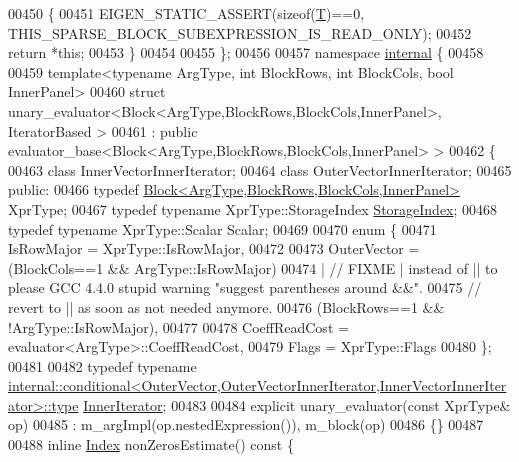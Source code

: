 \begin{DoxyCode}
00450     \{
00451       EIGEN\_STATIC\_ASSERT(\textcolor{keyword}{sizeof}(\hyperlink{group___sparse_core___module}{T})==0, THIS\_SPARSE\_BLOCK\_SUBEXPRESSION\_IS\_READ\_ONLY);
00452       \textcolor{keywordflow}{return} *\textcolor{keyword}{this};
00453     \}
00454 
00455 \};
00456 
00457 \textcolor{keyword}{namespace }\hyperlink{namespaceinternal}{internal} \{
00458 
00459 \textcolor{keyword}{template}<\textcolor{keyword}{typename} ArgType, \textcolor{keywordtype}{int} BlockRows, \textcolor{keywordtype}{int} BlockCols, \textcolor{keywordtype}{bool} InnerPanel>
00460 \textcolor{keyword}{struct }unary\_evaluator<Block<ArgType,BlockRows,BlockCols,InnerPanel>, IteratorBased >
00461  : \textcolor{keyword}{public} evaluator\_base<Block<ArgType,BlockRows,BlockCols,InnerPanel> >
00462 \{
00463     \textcolor{keyword}{class }InnerVectorInnerIterator;
00464     \textcolor{keyword}{class }OuterVectorInnerIterator;
00465   \textcolor{keyword}{public}:
00466     \textcolor{keyword}{typedef} \hyperlink{group___core___module_class_eigen_1_1_block}{Block<ArgType,BlockRows,BlockCols,InnerPanel>} 
      XprType;
00467     \textcolor{keyword}{typedef} \textcolor{keyword}{typename} XprType::StorageIndex \hyperlink{group___sparse_core___module_a0b540ba724726ebe953f8c0df06081ed}{StorageIndex};
00468     \textcolor{keyword}{typedef} \textcolor{keyword}{typename} XprType::Scalar Scalar;
00469 
00470     \textcolor{keyword}{enum} \{
00471       IsRowMajor = XprType::IsRowMajor,
00472 
00473       OuterVector =  (BlockCols==1 && ArgType::IsRowMajor)
00474                     | \textcolor{comment}{// FIXME | instead of || to please GCC 4.4.0 stupid warning "suggest parentheses
       around &&".}
00475                       \textcolor{comment}{// revert to || as soon as not needed anymore.}
00476                      (BlockRows==1 && !ArgType::IsRowMajor),
00477 
00478       CoeffReadCost = evaluator<ArgType>::CoeffReadCost,
00479       Flags = XprType::Flags
00480     \};
00481 
00482     \textcolor{keyword}{typedef} \textcolor{keyword}{typename} 
      \hyperlink{class_eigen_1_1internal_1_1_tensor_lazy_evaluator_writable}{internal::conditional<OuterVector,OuterVectorInnerIterator,InnerVectorInnerIterator>::type}
       \hyperlink{class_eigen_1_1_inner_iterator}{InnerIterator};
00483 
00484     \textcolor{keyword}{explicit} unary\_evaluator(\textcolor{keyword}{const} XprType& op)
00485       : m\_argImpl(op.nestedExpression()), m\_block(op)
00486     \{\}
00487 
00488     \textcolor{keyword}{inline} \hyperlink{group___core___module_a554f30542cc2316add4b1ea0a492ff02}{Index} nonZerosEstimate()\textcolor{keyword}{ const }\{

\end{DoxyCode}
